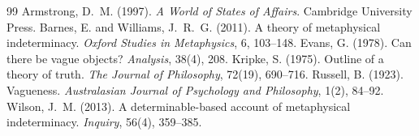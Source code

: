 \documentclass{situationist-preprint}
\begin{document}
\begin{thebibliography}{99}\small
{} Armstrong, D.~M. (1997). \emph{A World of States of Affairs}. Cambridge University Press.
 Barnes, E. and Williams, J.~R.~G. (2011). A theory of metaphysical indeterminacy. \emph{Oxford Studies in Metaphysics}, 6, 103--148.
 Evans, G. (1978). Can there be vague objects? \emph{Analysis}, 38(4), 208.
 Kripke, S. (1975). Outline of a theory of truth. \emph{The Journal of Philosophy}, 72(19), 690--716.
 Russell, B. (1923). Vagueness. \emph{Australasian Journal of Psychology and Philosophy}, 1(2), 84--92.
 Wilson, J.~M. (2013). A determinable-based account of metaphysical indeterminacy. \emph{Inquiry}, 56(4), 359--385.
\end{thebibliography}
\end{document}
